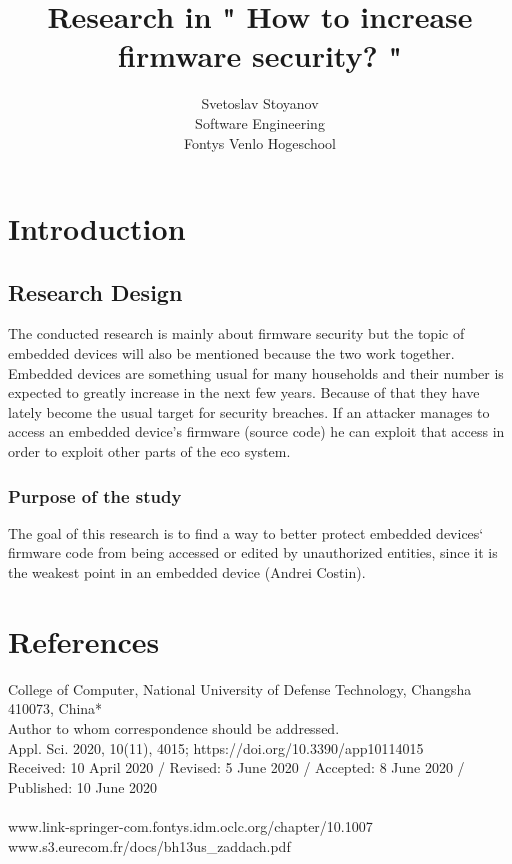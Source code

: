 \documentclass[]{report}
\begin{document}
\title{Research in " How to increase firmware security? " }
\author{Svetoslav Stoyanov \\
	Software Engineering \\
	Fontys Venlo Hogeschool}

\maketitle

\tableofcontents
\chapter{Introduction}
\section{Research Design}
The conducted research is mainly about firmware security but the topic of embedded devices will also be mentioned because the two work together.
Embedded devices are something usual for many households and their number is expected to greatly increase in the next few years. Because of that they have lately become the usual target for security breaches. If an attacker manages to access an embedded device's firmware (source code) he can exploit that access in order to exploit other parts of the eco system.

\subsection{Purpose of the study} 
The goal of this research is to find a way to better protect embedded devices` firmware code from being accessed or edited by unauthorized entities, since it is the weakest point in an embedded device (Andrei Costin).
\chapter{References}

College of Computer, National University of Defense Technology, Changsha 410073, China* \\

Author to whom correspondence should be addressed. \\
Appl. Sci. 2020, 10(11), 4015; https://doi.org/10.3390/app10114015 \\
Received: 10 April 2020 / Revised: 5 June 2020 / Accepted: 8 June 2020 / Published: 10 June 2020 \\
\\
www.link-springer-com.fontys.idm.oclc.org/chapter/10.1007%
\\
www.s3.eurecom.fr/docs/bh13us\_zaddach.pdf
\end{document}
